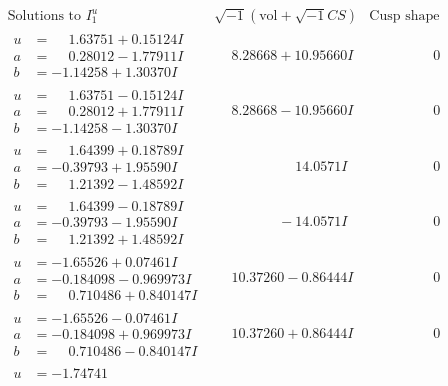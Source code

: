 \documentclass[1p]{elsarticle_modified}
\theoremstyle{definition}
\newcommand{\I}{\sqrt{-1}}
\begin{document}
$$\begin{array}{c|c|c}
\text{Solutions to }I^u_{1}& \I (\text{vol} + \sqrt{-1}CS) & \text{Cusp shape}\\
 \hline 
\begin{aligned}
u &= \phantom{-}1.63751 + 0.15124 I \\
a &= \phantom{-}0.28012 - 1.77911 I \\
b &= -1.14258 + 1.30370 I\end{aligned}
 & \phantom{-}8.28668 + 10.95660 I & \phantom{-0.000000 } 0 \\ \hline\begin{aligned}
u &= \phantom{-}1.63751 - 0.15124 I \\
a &= \phantom{-}0.28012 + 1.77911 I \\
b &= -1.14258 - 1.30370 I\end{aligned}
 & \phantom{-}8.28668 - 10.95660 I & \phantom{-0.000000 } 0 \\ \hline\begin{aligned}
u &= \phantom{-}1.64399 + 0.18789 I \\
a &= -0.39793 + 1.95590 I \\
b &= \phantom{-}1.21392 - 1.48592 I\end{aligned}
 & \phantom{-0.000000 -}14.0571 I & \phantom{-0.000000 } 0 \\ \hline\begin{aligned}
u &= \phantom{-}1.64399 - 0.18789 I \\
a &= -0.39793 - 1.95590 I \\
b &= \phantom{-}1.21392 + 1.48592 I\end{aligned}
 & \phantom{-0.000000 } -14.0571 I & \phantom{-0.000000 } 0 \\ \hline\begin{aligned}
u &= -1.65526 + 0.07461 I \\
a &= -0.184098 - 0.969973 I \\
b &= \phantom{-}0.710486 + 0.840147 I\end{aligned}
 & \phantom{-}10.37260 - 0.86444 I & \phantom{-0.000000 } 0 \\ \hline\begin{aligned}
u &= -1.65526 - 0.07461 I \\
a &= -0.184098 + 0.969973 I \\
b &= \phantom{-}0.710486 - 0.840147 I\end{aligned}
 & \phantom{-}10.37260 + 0.86444 I & \phantom{-0.000000 } 0 \\ \hline\begin{aligned}
u &= -1.74741\phantom{ +0.000000I} \\

\end{aligned}
\end{array}$$
\end{document}
